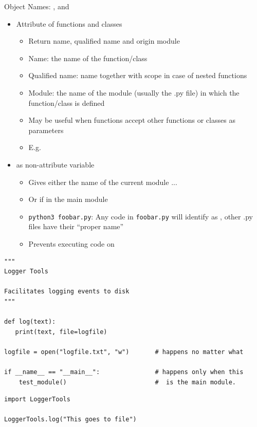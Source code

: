 \begin{frame}[fragile]{Object Names: ,  and }
%
\begin{itemize}
\item Attribute of functions and classes
	\begin{itemize}
	\item Return name, qualified name and origin module
	\item Name: the name of the function/class
	\item Qualified name: name together with scope in case of nested functions
	\item Module: the name of the module (usually the .py file) in which the function/class is defined
	\item May be useful when functions accept other functions or classes as parameters
	\item E.\;g. 
	\end{itemize}
\item {} as non-attribute variable
	\begin{itemize}
	\item Gives either the name of the current module ...
	\item Or  if in the main module
	\item \texttt{python3 foobar.py}: Any code in \texttt{foobar.py} will identify as , other .py files have their \enquote{proper name}
	\item Prevents executing code on 
	\end{itemize}
\end{itemize}
%
\end{frame}


\begin{frame}[fragile]
%
\begin{codebox}
\begin{verbatim}
""" 
Logger Tools

Facilitates logging events to disk
"""

def log(text):
   print(text, file=logfile)

logfile = open("logfile.txt", "w")       # happens no matter what

if __name__ == "__main__":               # happens only when this
    test_module()                        #  is the main module.
\end{verbatim}
\end{codebox}
%
\begin{codebox}
\begin{verbatim}
import LoggerTools

LoggerTools.log("This goes to file")
\end{verbatim}
\end{codebox}
%
\end{frame}

